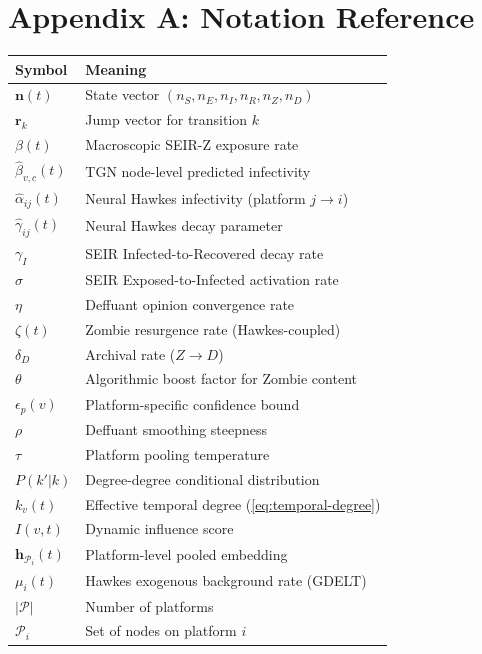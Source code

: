 \documentclass[11pt]{article}
\newcommand{\hv}{\mathbf{h}}
\newcommand{\bn}{\mathbf{n}}
\newcommand{\br}{\mathbf{r}}
\newcommand{\cP}{\mathcal{P}}
\begin{document}


\appendix

\section*{Appendix A: Notation Reference}

\begin{center}
\small
\setlength{\tabcolsep}{4pt}
\begin{tabular}{ll}
\toprule
\textbf{Symbol} & \textbf{Meaning} \\
\midrule
$\bn(t)$ & State vector $(n_S,n_E,n_I,n_R,n_Z,n_D)$ \\
$\br_k$ & Jump vector for transition $k$ \\
$\beta(t)$ & Macroscopic SEIR-Z exposure rate \\
$\hat{\beta}_{v,c}(t)$ & TGN node-level predicted infectivity \\
$\hat{\alpha}_{ij}(t)$ & Neural Hawkes infectivity (platform $j\to i$) \\
$\hat{\gamma}_{ij}(t)$ & Neural Hawkes decay parameter \\
$\gamma_I$ & SEIR Infected-to-Recovered decay rate \\
$\sigma$ & SEIR Exposed-to-Infected activation rate \\
$\eta$ & Deffuant opinion convergence rate \\
$\zeta(t)$ & Zombie resurgence rate (Hawkes-coupled) \\
$\delta_D$ & Archival rate ($Z\to D$) \\
$\theta$ & Algorithmic boost factor for Zombie content \\
$\epsilon_p(v)$ & Platform-specific confidence bound \\
$\rho$ & Deffuant smoothing steepness \\
$\tau$ & Platform pooling temperature \\
$P(k'|k)$ & Degree-degree conditional distribution \\
$k_v(t)$ & Effective temporal degree (\cref{eq:temporal-degree}) \\
$I(v,t)$ & Dynamic influence score \\
$\hv_{\cP_i}(t)$ & Platform-level pooled embedding \\
$\mu_i(t)$ & Hawkes exogenous background rate (GDELT) \\
$|\cP|$ & Number of platforms \\
$\cP_i$ & Set of nodes on platform $i$ \\
\bottomrule
\end{tabular}
\end{center}
\end{document}
